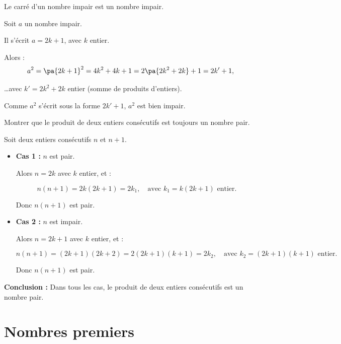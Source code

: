 \begin{propriete}
	Le carré d'un nombre impair est un nombre impair.
\end{propriete}

\begin{demo}
	Soit $a$ un nombre impair.

	Il s'écrit $a = 2k + 1$, avec $k$ entier.

	Alors :
	\[
		a^2 = \pa{2k + 1}^2 = 4k^2 + 4k + 1 = 2\pa{2k^2 + 2k} + 1 = 2k' + 1,
	\]

	\ldots avec $k' = 2k^2 + 2k$ entier (somme de produits d'entiers).

	Comme $a^2$ s'écrit sous la forme $2k' + 1$, $a^2$ est bien impair.
\end{demo}

\begin{methode}
	Montrer que le produit de deux entiers consécutifs est toujours un nombre pair.

	\begin{correction}
		Soit deux entiers consécutifs $n$ et $n + 1$.
		\begin{itemize}
			\item \textbf{Cas 1 :} $n$ est pair.

			      Alors $n = 2k$ avec $k$ entier, et :

			      \[
				      n(n + 1) = 2k(2k + 1) = 2k_1, \quad \text{avec } k_1 = k(2k + 1) \text{ entier}.
			      \]

			      Donc $n(n + 1)$ est pair.

			\item \textbf{Cas 2 :} $n$ est impair.

			      Alors $n = 2k + 1$ avec $k$ entier, et :

			      \[
				      n(n + 1) = (2k + 1)(2k + 2) = 2(2k + 1)(k + 1) = 2k_2, \quad \text{avec } k_2 = (2k + 1)(k + 1) \text{ entier}.
			      \]

			      Donc $n(n + 1)$ est pair.
		\end{itemize}

		\textbf{Conclusion :} Dans tous les cas, le produit de deux entiers consécutifs est un nombre pair.
	\end{correction}
\end{methode}

\section{Nombres premiers}

